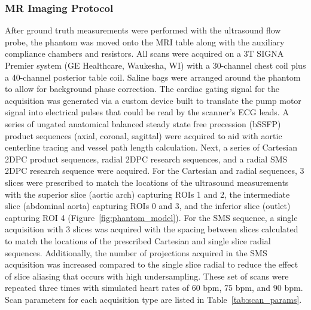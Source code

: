 \subsubsection{MR Imaging Protocol}
After ground truth measurements were performed with the ultrasound flow probe, the phantom was moved onto the MRI table along with the auxiliary compliance chambers and resistors. All scans were acquired on a 3T SIGNA Premier system (GE Healthcare, Waukesha, WI) with a 30-channel chest coil plus a 40-channel posterior table coil. Saline bags were arranged around the phantom to allow for background phase correction. The cardiac gating signal for the acquisition was generated via a custom device built to translate the pump motor signal into electrical pulses that could be read by the scanner's ECG leads. A series of ungated anatomical balanced steady state free precession (bSSFP) product sequences (axial, coronal, sagittal) were acquired to aid with aortic centerline tracing and vessel path length calculation. Next, a series of Cartesian 2DPC product sequences, radial 2DPC research sequences, and a radial SMS 2DPC research sequence were acquired. For the Cartesian and radial sequences, 3 slices were prescribed to match the locations of the ultrasound measurements with the superior slice (aortic arch) capturing ROIs 1 and 2, the intermediate slice (abdominal aorta) capturing ROIs 0 and 3, and the inferior slice (outlet) capturing ROI 4 (Figure~\ref{fig:phantom_model}). For the SMS sequence, a single acquisition with 3 slices was acquired with the spacing between slices calculated to match the locations of the prescribed Cartesian and single slice radial sequences. Additionally, the number of projections acquired in the SMS acquisition was increased compared to the single slice radial to reduce the effect of slice aliasing that occurs with high undersampling. These set of scans were repeated three times with simulated heart rates of 60 bpm, 75 bpm, and 90 bpm. Scan parameters for each acquisition type are listed in Table~\ref{tab:scan_params}.

